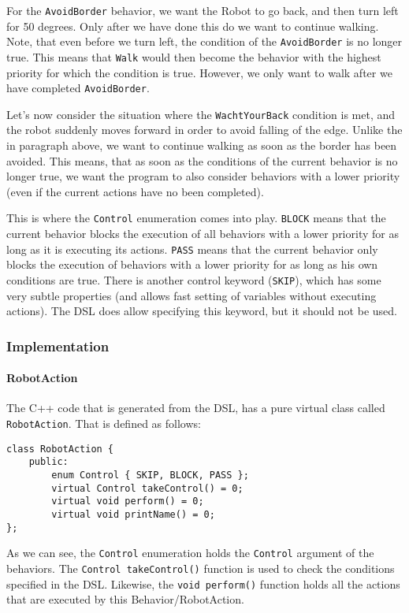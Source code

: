 \documentclass{scrartcl}
\begin{document}
For the \texttt{AvoidBorder} behavior, we want the Robot to go back, and then turn left for 50 degrees.
Only after we have done this do we want to continue walking.
Note, that even before we turn left, the condition of the \texttt{AvoidBorder} is no longer true.
This means that \texttt{Walk} would then become the behavior with the highest priority for which the condition is true.
However, we only want to walk after we have completed \texttt{AvoidBorder}.

Let's now consider the situation where the \texttt{WachtYourBack} condition is met, and the robot suddenly moves forward in order to avoid falling of the edge.
Unlike the in paragraph above, we want to continue walking as soon as the border has been avoided.
This means, that as soon as the conditions of the current behavior is no longer true, we want the program to also consider behaviors with a lower priority (even if the current actions have no been completed).

This is where the \texttt{Control} enumeration comes into play.
\texttt{BLOCK} means that the current behavior blocks the execution of all behaviors with a lower priority for as long as it is executing its actions.
\texttt{PASS} means that the current behavior only blocks the execution of behaviors with a lower priority for as long as his own conditions are true. There is another control keyword (\texttt{SKIP}), which has some very subtle properties (and allows fast setting of variables without executing actions).
The DSL does allow specifying this keyword, but it should not be used.

\subsubsection{Implementation}
\paragraph{RobotAction}
The C++ code that is generated from the DSL, has a pure virtual class called \texttt{RobotAction}. That is defined as follows:
\begin{verbatim}
class RobotAction {
	public:
		enum Control { SKIP, BLOCK, PASS };
		virtual Control takeControl() = 0;
		virtual void perform() = 0;
		virtual void printName() = 0;
};
\end{verbatim}
As we can see, the \texttt{Control} enumeration holds the \texttt{Control} argument of the behaviors.
The \texttt{Control takeControl()} function is used to check the conditions specified in the DSL.
Likewise, the \texttt{void perform()} function holds all the actions that are executed by this Behavior/RobotAction.
\end{document}
